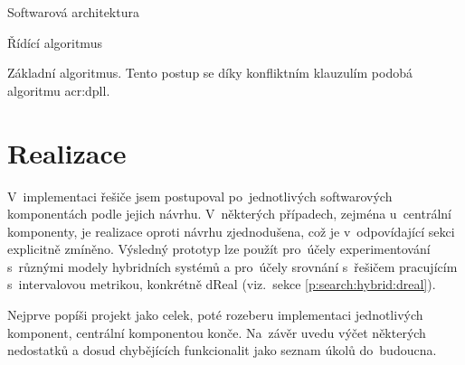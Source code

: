 \documentclass[thesis=M,czech]{FITthesis}[2012/06/26]
\newcommand{\acrlabel}[1]{acr:#1}
\newcommand{\acr}[1]{\acrshort{\acrlabel{#1}}}
\newcommand{\rf}[1]{\ref{#1}}
\begin{document}
\begin{section}{Softwarová architektura}
\begin{subsection}{Řídící algoritmus}
\begin{paragraph}{Základní algoritmus.}
Tento postup se díky konfliktním klauzulím
podobá algoritmu \acr{dpll}.
\end{paragraph} %


\end{subsection} %


\end{section} %



\chapter{Realizace}\label{ch:impl}
V~implementaci řešiče jsem postupoval
po~jednotlivých softwarových komponentách
podle jejich návrhu.
V~některých případech,
zejména u~centrální komponenty,
je realizace oproti návrhu zjednodušena,
což je v~odpovídající sekci explicitně zmíněno.
Výsledný prototyp lze použít
pro~účely experimentování s~různými modely hybridních systémů
a pro~účely srovnání s~řešičem
pracujícím s~intervalovou metrikou,
konkrétně dReal (viz.~sekce \rf{p:search:hybrid:dreal}).

Nejprve popíši projekt jako celek,
poté rozeberu implementaci jednotlivých komponent,
centrální komponentou konče.
Na~závěr uvedu výčet některých nedostatků
a dosud chybějících funkcionalit
jako seznam úkolů do~budoucna.

\end{document}
